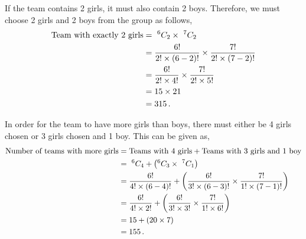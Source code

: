 \begin{subquestions}
\begin{subsubquestions}

\subsubquestion

If the team contains 2 girls, it must also contain 2 boys. Therefore, we must choose 2 girls and 2 boys from the group as follows,
\begin{align}
	\text{Team with exactly 2 girls} & = ~^6C_2 \times ~^7C_2 \nonumber \\
	                                 & = \frac{6!}{2! \times (6-2)!} \times \frac{7!}{2! \times (7-2)!} \nonumber \\
	                                 & = \frac{6!}{2! \times 4!} \times \frac{7!}{2! \times 5!} \nonumber \\
	                                 & = 15 \times 21 \nonumber \\
	                                 & = 315 \,.
\end{align}


\subsubquestion

In order for the team to have more girls than boys, there must either be 4 girls chosen or 3 girls chosen and 1 boy. This can be given as,
\begin{align}
	\text{Number of teams with more girls} & = \text{Teams with 4 girls} + \text{Teams with 3 girls and 1 boy} \nonumber \\
	                                       & = ~^6C_4 + \left(^6C_3 \times ~^7C_1 \right) \nonumber \\
	                                       & = \frac{6!}{4! \times (6-4)!} + \left(\frac{6!}{3! \times (6-3)!} \times \frac{7!}{1! \times (7-1)!} \right) \nonumber \\
	                                       & = \frac{6!}{4! \times 2!} + \left(\frac{6!}{3! \times 3!} \times \frac{7!}{1! \times 6!} \right) \nonumber \\
	                                       & = 15 + (20 \times 7) \nonumber \\
	                                       & = 155 \,.
\end{align}

\end{subsubquestions}



\end{subquestions}
